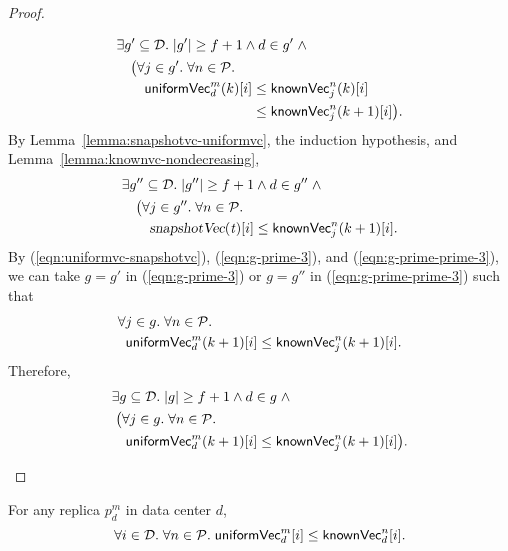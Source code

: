 \begin{proof}
\begin{itemize}
\begin{itemize}
\begin{align}
            &\exists g' \subseteq \D.\; |g'| \ge f + 1 \land d \in g'\; \land
              \label{eqn:g-prime-3} \\
              &\quad \big(\forall j \in g'.\; \forall n \in \P. \nonumber \\
                &\qquad \uniformVC^{m}_{d}(k)[i] \le \knownVC^{n}_{j}(k)[i] \nonumber \\
                &\phantom{\qquad \uniformVC^{m}_{d}(k)[i] }
                  \le \knownVC^{n}_{j}(k+1)[i]\big). \nonumber
          \end{align}
          By Lemma~\ref{lemma:snapshotvc-uniformvc}, the induction hypothesis,
          and Lemma~\ref{lemma:knownvc-nondecreasing},
          \begin{align}
            &\exists g'' \subseteq \mathcal{D}.\; |g''| \ge f + 1 \land d \in g''\; \land
              \label{eqn:g-prime-prime-3} \\
              &\quad \big(\forall j \in g''.\; \forall n \in \mathcal{P}. \nonumber \\
                &\qquad \textsl{snapshotVec}(\mathit{t})[i] \le {\sf knownVec}^{n}_{j}(k+1)[i]. \nonumber
          \end{align}
          By (\ref{eqn:uniformvc-snapshotvc}), (\ref{eqn:g-prime-3}),
          and (\ref{eqn:g-prime-prime-3}),
          we can take $g = g'$ in (\ref{eqn:g-prime-3})
          or $g = g''$ in (\ref{eqn:g-prime-prime-3}) such that
          \begin{align*}
            &\forall j \in g.\; \forall n \in \mathcal{P}.\; \\
              &\;\; {\sf uniformVec}^{m}_{d}(k+1)[i] \le {\sf knownVec}^{n}_{j}(k+1)[i].
          \end{align*}
          Therefore,
          \begin{align*}
            &\exists g \subseteq \mathcal{D}.\; |g| \ge f + 1 \land d \in g\; \land \\
              &\; \big(\forall j \in g.\; \forall n \in \mathcal{P}.\; \\
                &\quad {\sf uniformVec}^{m}_{d}(k+1)[i] \le {\sf knownVec}^{n}_{j}(k+1)[i] \big).
          \end{align*}
      \end{itemize}
  \end{itemize}
\end{proof}

\begin{applemma} \label{lemma:uniformvc-knownvc}
  For any replica $p^{m}_{d}$ in data center $d$,
  \[
    \forall i \in \mathcal{D}.\; \forall n \in \mathcal{P}.\;
      {\sf uniformVec}^{m}_{d}[i] \le {\sf knownVec}^{n}_{d}[i].
  \]
\end{applemma}

